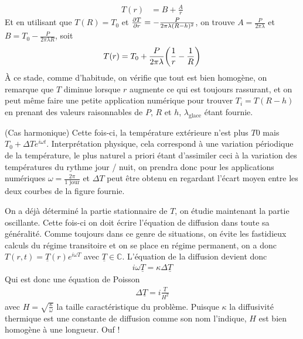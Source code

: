 \begin{solution}
\begin{questions}
\begin{align*}
         T(r) &= B + \frac{A}{r}
    \end{align*}
    Et en utilisant que $T(R) = T_0$ et $\pdv{T}{r}(R-h) = -\frac{P}{2\pi \lambda (R-h)^2}$, on trouve $A = \frac{P}{2\pi \lambda}$ et $B = T_0 - \frac{P}{2\pi \lambda R}$, soit 
    \begin{align*}
        T(r) = T_0 + \frac{P}{2\pi \lambda}\qty(\frac1r-\frac1R)
    \end{align*}
    À ce stade, comme d'habitude, on vérifie que tout est bien homogène, on remarque que $T$ diminue lorsque $r$ augmente ce qui est toujours rassurant, et on peut même faire une petite application numérique pour trouver $T_i = T(R-h)$ en prenant des valeurs raisonnables de $P$, $R$ et $h$, $\lambda_{\text{glace}}$ étant fournie.
    
    \question (\textsf{Cas harmonique}) Cette fois-ci, la température extérieure n'est plus $T0$ mais $T_0 + \Delta T e^{i\omega t}$. Interprétation physique, cela correspond à une variation périodique de la température, le plus naturel a priori étant d'assimiler ceci à la variation des températures du rythme jour / nuit, on prendra donc pour les applications numériques $\omega = \frac{2\pi}{1\text{ jour}}$ et $\Delta T$ peut être obtenu en regardant l'écart moyen entre les deux courbes de la figure fournie.
    
    \question On a déjà déterminé la partie stationnaire de $T$, on étudie maintenant la partie oscillante. Cette fois-ci on doit écrire l'équation de diffusion dans toute sa généralité. Comme toujours dans ce genre de situations, on évite les fastidieux calculs du régime transitoire et on se place en régime permanent, on a donc $T(r, t) = \underline{T}(r) e^{i\omega T}$ avec $\underline{T} \in \mathbb{C}$. L'équation de la diffusion devient donc
    \begin{align*}
        i \omega \underline{T} = \kappa \Delta \underline{T} 
    \end{align*}
    Qui est donc une équation de Poisson
    \begin{align*}
        \Delta \underline{T} = i \frac{\underline{T}}{H^2}
    \end{align*}
    avec $H = \sqrt{\frac{\kappa}{\omega}}$ la taille caractéristique du problème. Puisque $\kappa$ la diffusivité thermique est une constante de diffusion comme son nom l'indique, $H$ est bien homogène à une longueur. Ouf !
    

\end{questions}
\end{solution}
